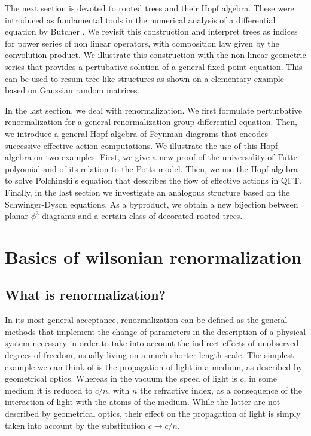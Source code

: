 \documentclass[12pt,here,feynmf]{article}
\begin{document}
The next section is devoted to rooted trees and their Hopf algebra. These were introduced as fundamental tools in the numerical analysis of a differential equation by Butcher \cite{butcher}. We revisit this construction and interpret trees as indices for power series of non linear operators, with composition law given by the convolution product. We illustrate this construction with the non linear geometric series that provides a pertubative solution of a general fixed point equation. This can be used to resum tree like structures as shown on a elementary example based on Gaussian random matrices.

In the last section, we deal with renormalization. We first formulate perturbative renormalization for a general renormalization group differential equation. Then, we introduce a general Hopf algebra of Feynman diagrams that encodes successive effective action computations. We illustrate the use of this Hopf algebra on two examples. First, we give a new proof of the universality of Tutte polyomial and of its relation to the Potts model. Then, we use the Hopf algebra to solve Polchinski's equation that describes the flow of effective actions in QFT. Finally, in the last section we investigate an analogous structure based on the Schwinger-Dyson equations. As a byproduct, we obtain a new bijection between planar $\phi^{3}$ diagrams and a certain class of decorated rooted trees.  
 



\section{Basics of wilsonian renormalization}

\subsection{What is renormalization?}



In its most general acceptance, renormalization can be defined as the general methods that implement the change of parameters in the description of a physical system necessary in order to take into account the indirect effects of unobserved degrees of freedom, usually living on a much shorter length scale. The simplest example we can think of is the propagation of light in a medium, as described by geometrical optics. Whereas in the vacuum the speed of light is $c$, in some medium it is reduced to $c/n$, with $n$ the refractive index, as a consequence of the interaction of light with the atoms of the medium. While the latter are not described by geometrical optics, their effect on the propagation of light is simply taken into account by the substitution $c\rightarrow c/n$.
\end{document}
